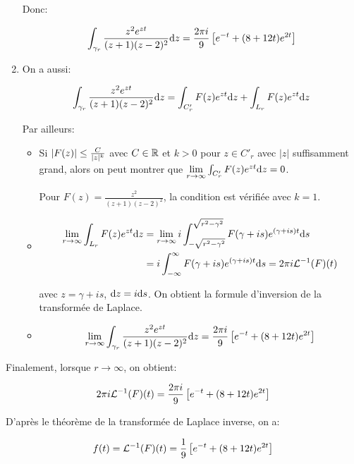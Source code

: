 \begin{example}[3]
\begin{enumerate}
        Donc:
        
        \[ \int_{\gamma_r} \frac{z^2 e^{zt}}{(z+1)(z-2)^2} \mathrm{d}z = \frac{2 \pi i}{9} \left[ e^{-t} + (8 + 12t) e^{2t} \right] \]
        
        \item 
        On a aussi:
        
        \[
            \int_{\gamma_r} \frac{z^2 e^{zt}}{(z+1)(z-2)^2} \mathrm{d}z
            = \int_{C'_r} F(z) e^{zt} \mathrm{d}z + \int_{L_r} F(z) e^{zt} \mathrm{d}z
        \]
        
        Par ailleurs:
        \begin{itemize}
            \item 
            Si $\left|F(z)\right| \leq \frac{C}{|z|^k}$ avec $C \in \mathbb{R}$ et $k > 0$ pour $z \in C'_r$ avec $|z|$ suffisamment grand, alors on peut montrer que $\lim\limits_{r \rightarrow \infty} \int_{C'_r} F(z)e^{zt} \mathrm{d}z = 0$.
            
            Pour $F(z) = \frac{z^2}{(z+1)(z-2)^2}$, la condition est vérifiée avec $k = 1$.
            
            \item 
            \begin{align*}
                \lim_{r \rightarrow \infty} \int_{L_r} F(z) e^{zt} \mathrm{d}z
                &= \lim_{r \rightarrow \infty}
                i \int_{-\sqrt{r^2 - \gamma^2}}^{\sqrt{r^2 - \gamma^2}} F(\gamma + is) e^{(\gamma + is)t} \mathrm{d}s
                \\&= i \int_{-\infty}^\infty F(\gamma + is) e^{(\gamma + is)t} \mathrm{d}s
                = 2 \pi i \mathcal{L}^{-1}(F)(t)
            \end{align*}
            
            avec $z = \gamma + is$, $\mathrm{d}z = i \mathrm{d}s$.
            On obtient la formule d'inversion de la transformée de Laplace.
            
            \item 
            \[
                \lim\limits_{r \rightarrow \infty} \int_{\gamma_r} \frac{z^2 e^{zt}}{(z+1)(z-2)^2} \mathrm{d}z
                = \frac{2 \pi i}{9} \left[ e^{-t} + (8 + 12t) e^{2t} \right]
            \]
        \end{itemize}
    \end{enumerate}

Finalement, lorsque $r \rightarrow \infty$, on obtient:

\[
    2 \pi i \mathcal{L}^{-1}(F)(t) = \frac{2 \pi i}{9} \left[ e^{-t} + (8 + 12t) e^{2t} \right]
\]

D'après le théorème de la transformée de Laplace inverse, on a:

\[
    f(t) = \mathcal{L}^{-1}(F)(t)
    = \frac{1}{9} \left[ e^{-t} + (8 + 12t) e^{2t} \right]
\]
\end{example}

